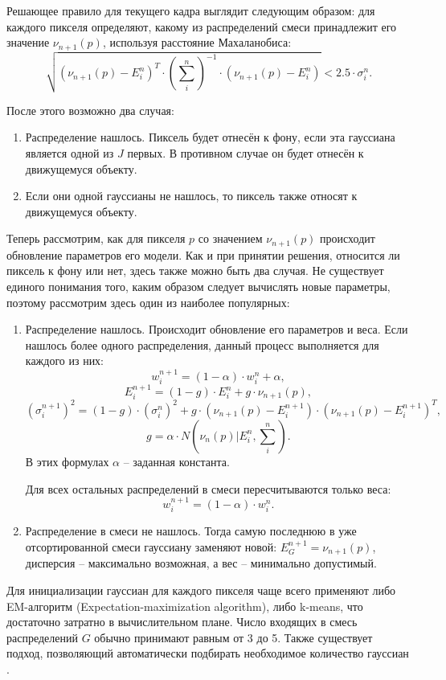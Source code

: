 Решающее правило для текущего кадра выглядит следующим образом: для каждого
пикселя определяют, какому из распределений смеси принадлежит его значение
$\nu_{n+1}(p)$, используя расстояние Махаланобиса:
\begin{equation}
	\sqrt{
	(\nu_{n+1}(p)-E^n_i)^T \cdot (\sum_i^n)^{-1} \cdot 
	(\nu_{n+1}(p) - E^n_i)} < 2.5 \cdot \sigma^n_i.
	\label{mahalabobis}
\end{equation}

После этого возможно два случая:
\begin{enumerate}
	\item Распределение нашлось. Пиксель будет отнесён к фону, если эта
гауссиана является одной из $J$ первых. В противном случае он будет отнесён
к движущемуся объекту.
	\item Если они одной гауссианы не нашлось, то пиксель также относят
к движущемуся объекту.
\end{enumerate}

Теперь рассмотрим, как для пикселя $p$ со значением $\nu_{n+1}(p)$
происходит обновление параметров его модели. Как и при принятии решения,
относится ли пиксель к фону или нет, здесь также можно быть два случая.
Не существует единого понимания того, каким образом следует вычислять новые
параметры, поэтому рассмотрим здесь один из наиболее популярных:
\begin{enumerate}
	\item Распределение нашлось. Происходит обновление его параметров и веса.
Если нашлось более одного распределения, данный процесс выполняется для каждого
из них:
$$w^{n+1}_i = (1-\alpha) \cdot w^n_i + \alpha, $$
$$ E^{n+1}_i = (1-g)\cdot E^n_i + g \cdot \nu_{n+1}(p), $$
$$ (\sigma_i^{n+1})^2 = (1-g)\cdot (\sigma_i^n)^2 + 
g \cdot (\nu_{n+1}(p) - E_i^{n+1}) \cdot (\nu_{n+1}(p) - E^{n+1}_i)^T, $$
$$ g=\alpha \cdot N(\nu_n(p)|E_i^n, \sum_i^n). $$
В этих формулах $\alpha$ -- заданная
константа.

Для всех остальных распределений в смеси пересчитываются только веса:
$$ w^{n+1}_i=(1-\alpha) \cdot w^n_i.$$
	\item Распределение в смеси не нашлось. Тогда самую последнюю в уже 
отсортированной смеси гауссиану заменяют новой: $E^{n+1}_G=\nu_{n+1}(p)$,
дисперсия -- максимально возможная, а вес -- минимально допустимый.
\end{enumerate}

Для инициализации гауссиан для каждого пикселя чаще всего применяют либо
EM-алгоритм (Expectation-maximization algorithm), либо k-means, что
достаточно затратно в вычислительном плане. Число входящих в смесь распределений
$G$ обычно принимают равным от 3 до 5. Также существует подход, позволяющий
автоматически подбирать необходимое количество гауссиан \cite{MOG-2}. 

